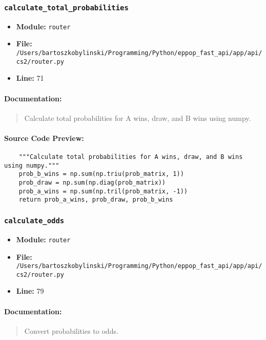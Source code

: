 \documentclass[11pt,a4paper]{article}
\begin{document}
\vspace{1em}
\subsubsection{\texttt{calculate\_total\_probabilities}}

\begin{itemize}
    \item \textbf{Module:} \texttt{router}
    \item \textbf{File:} \texttt{/Users/bartoszkobylinski/Programming/Python/eppop\_fast\_api/app/api/cs2/router.py}
    \item \textbf{Line:} 71
\end{itemize}

\paragraph{Documentation:}
\begin{quote}
Calculate total probabilities for A wins, draw, and B wins using numpy.
\end{quote}

\paragraph{Source Code Preview:}
\begin{verbatim}
    """Calculate total probabilities for A wins, draw, and B wins using numpy."""
    prob_b_wins = np.sum(np.triu(prob_matrix, 1))
    prob_draw = np.sum(np.diag(prob_matrix))
    prob_a_wins = np.sum(np.tril(prob_matrix, -1))
    return prob_a_wins, prob_draw, prob_b_wins
\end{verbatim}

\vspace{1em}
\subsubsection{\texttt{calculate\_odds}}

\begin{itemize}
    \item \textbf{Module:} \texttt{router}
    \item \textbf{File:} \texttt{/Users/bartoszkobylinski/Programming/Python/eppop\_fast\_api/app/api/cs2/router.py}
    \item \textbf{Line:} 79
\end{itemize}

\paragraph{Documentation:}
\begin{quote}
Convert probabilities to odds.
\end{quote}
\end{document}

